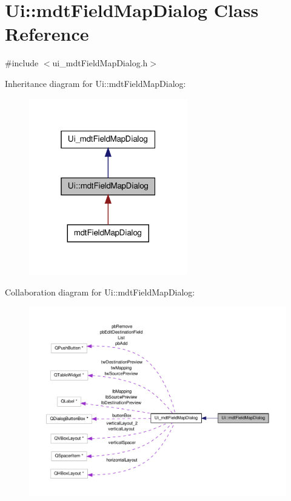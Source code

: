 \hypertarget{class_ui_1_1mdt_field_map_dialog}{\section{Ui\-:\-:mdt\-Field\-Map\-Dialog Class Reference}
\label{class_ui_1_1mdt_field_map_dialog}
}


{\ttfamily \#include $<$ui\-\_\-mdt\-Field\-Map\-Dialog.\-h$>$}



Inheritance diagram for Ui\-:\-:mdt\-Field\-Map\-Dialog\-:
\nopagebreak
\begin{figure}[H]
\begin{center}
\leavevmode
\includegraphics[width=196pt]{class_ui_1_1mdt_field_map_dialog__inherit__graph}
\end{center}
\end{figure}


Collaboration diagram for Ui\-:\-:mdt\-Field\-Map\-Dialog\-:
\nopagebreak
\begin{figure}[H]
\begin{center}
\leavevmode
\includegraphics[width=350pt]{class_ui_1_1mdt_field_map_dialog__coll__graph}
\end{center}
\end{figure}
